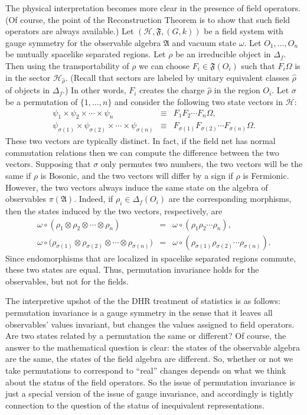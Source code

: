 \documentclass[12pt]{article}
\theoremstyle{definition}
\theoremstyle{definition}
\theoremstyle{remark}
\def\2#1{{\mathcal #1}}
\def\al#1{{\mathfrak #1}}
\def\om{\omega} \def\Om{\Omega} \def\dd{\partial} \def\D{\Delta}
\begin{document}
The physical interpretation becomes more clear in the presence of
field operators.  (Of course, the point of the Reconstruction Theorem
is to show that such field operators are always available.)  Let $(\2H
,\al F,(G,k))$ be a field system with gauge symmetry for the
observable algebra $\al A$ and vacuum state $\om$.  Let $O_1,\dots
,O_n$ be mutually spacelike separated regions.  Let $\rho$ be an
irreducible object in $\D _f$.  Then using the transportability of
$\rho$ we can choose $F_i\in \al F(O_i)$ such that $F_i\Om$ is in the
sector $\2H _{\hat{\rho}}$.  (Recall that sectors are labeled by
unitary equivalent classes $\hat{\rho}$ of objects in $\D _f$.)  In
other words, $F_i$ creates the charge $\hat{\rho}$ in the region
$O_i$.  Let $\sigma$ be a permutation of $\{ 1,\dots ,n \}$ and
consider the following two state vectors in $\2H$:
\begin{eqnarray}
  \psi _1\times \psi _2\times \cdots \times \psi _n &\equiv & F_1F_2\cdots
  F_n\Om  ,\label{ident} \\
  \psi _{\sigma (1)}\times \psi _{\sigma (2)}\times \cdots \times \psi _{\sigma
    (n)} & \equiv & F_{\sigma (1)}F_{\sigma (2)}\cdots F_{\sigma
    (n)}\Om . \label{permu}
\end{eqnarray}
These two vectors are typically distinct.  In fact, if the field net
has normal commutation relations then we can compute the difference
between the two vectors.  Supposing that $\sigma$ only permutes two
numbers, the two vectors will be the same if $\rho$ is Bosonic, and
the two vectors will differ by a sign if $\rho$ is Fermionic.
However, the two vectors always induce the same state on the algebra
of observables $\pi (\al A)$.  Indeed, if $\rho _i\in \D _f(O_i)$ are
the corresponding morphisms, then the states induced by the two
vectors, respectively, are
\begin{eqnarray}
  \om \circ (\rho  _1\otimes \rho _2\otimes \cdots \otimes \rho _n) &=& \om \circ (\rho _1\rho
  _2\cdots \rho _n) ,\\
  \om \circ \bigl( \rho _{\sigma (1)}\otimes \rho _{\sigma (2)}\otimes
  \cdots \otimes \rho _{\sigma (n)}\bigr) & = & \om \circ (\rho _{\sigma (1)}\rho
  _{\sigma (2)}\cdots \rho _{\sigma (n)}) .
\end{eqnarray}
Since endomorphisms that are localized in spacelike separated regions
commute, these two states are equal.  Thus, permutation invariance
holds for the observables, but not for the fields.

The interpretive upshot of the the DHR treatment of statistics is as
follows: permutation invariance is a gauge symmetry in the sense that
it leaves all observables' values invariant, but changes the values
assigned to field operators.  Are two states related by a permutation
the same or different?  Of course, the answer to the mathematical
question is clear: the states of the observable algebra are the same,
the states of the field algebra are different.  So, whether or not we
take permutations to correspond to ``real'' changes depends on what we
think about the status of the field operators.  So the issue of
permutation invariance is just a special version of the issue of gauge
invariance, and accordingly is tightly connection to the question of
the status of inequivalent representations.
\end{document}

